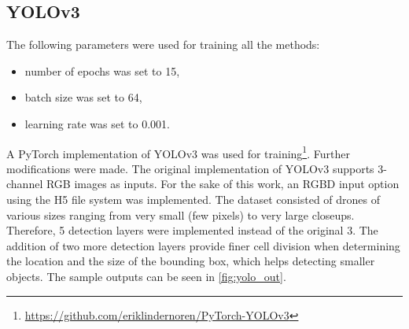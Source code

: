 \documentclass[twoside]{ctuthesis}
\theoremstyle{plain}
\theoremstyle{definition}
\theoremstyle{note}
\begin{document}
\subsection{YOLOv3}
The following parameters were used for training all the methods:
\begin{itemize}
	\item number of epochs was set to 15,
	\item batch size was set to 64,
	\item learning rate was set to 0.001.
\end{itemize}
A PyTorch implementation of YOLOv3 was used for training\footnote{\url{https://github.com/eriklindernoren/PyTorch-YOLOv3}}. Further modifications were made. The original implementation of YOLOv3 supports 3-channel RGB images as inputs. For the sake of this work, an RGBD input option using the H5 file system was implemented. The dataset consisted of drones of various sizes ranging from very small (few pixels) to very large closeups. Therefore, 5 detection layers were implemented instead of the original 3. The addition of two more detection layers provide finer cell division when determining the location and the size of the bounding box, which helps detecting smaller objects. The sample outputs can be seen in \autoref{fig:yolo_out}.
\end{document}
